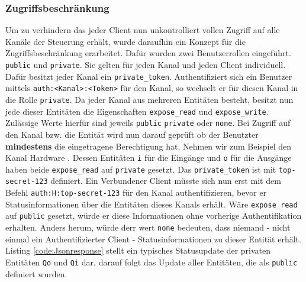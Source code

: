 \subsubsection{Zugriffsbeschränkung}
Um zu verhindern das jeder Client nun unkontrolliert vollen Zugriff auf alle Kanäle der Steuerung erhält, wurde daraufhin ein Konzept für die Zugriffsbeschränkung erarbeitet. Dafür wurden zwei Benutzerrollen eingeführt. \texttt{public} und \texttt{private}. Sie gelten für jeden Kanal und jeden Client individuell. Dafür besitzt jeder Kanal ein \texttt{private\_token}. Authentifiziert sich ein Benutzer mittels \texttt{auth:<Kanal>:<Token>} für den Kanal, so wechselt er für diesen Kanal in die Rolle \texttt{private}. Da jeder Kanal aus mehreren Entitäten besteht, besitzt nun jede dieser Entitäten die Eigenschaften \texttt{expose\_read} und \texttt{expose\_write}. Zulässige Werte hierfür sind jeweils \texttt{public} \texttt{private} oder \texttt{none}. Bei Zugriff auf den Kanal bzw. die Entität wird nun darauf geprüft ob der Benutzter \textbf{mindestens} die eingetragene Berechtigung hat. Nehmen wir zum Beispiel den Kanal Hardware . Dessen Entitäten \texttt{i} für die Eingänge und \texttt{o} für die Ausgänge haben beide \texttt{expose\_read} auf \texttt{private} gesetzt. Das \texttt{private\_token} ist mit \texttt{top-secret-123} definiert. Ein Verbundener Client müsste sich nun erst mit dem Befehl \texttt{auth:H:top-secret-123} für den Kanal authentifizieren, bevor er Statusinformationen über die Entitäten dieses Kanals erhält. Wäre \texttt{expose\_read} auf \texttt{public} gesetzt, würde er diese Informationen ohne vorherige Authentifikation erhalten. Anders herum, würde derr wert \texttt{none} bedeuten, dass niemand - nicht einmal ein Authentifizierter Client - Statusinformationen zu dieser Entität erhält. Listing \ref{code:Jsonresponse} stellt ein typisches Statusupdate der privaten Entitäten \texttt{Qo} und \texttt{Qi} dar, darauf folgt das Update aller Entitäten, die als \texttt{public} definiert wurden.  

